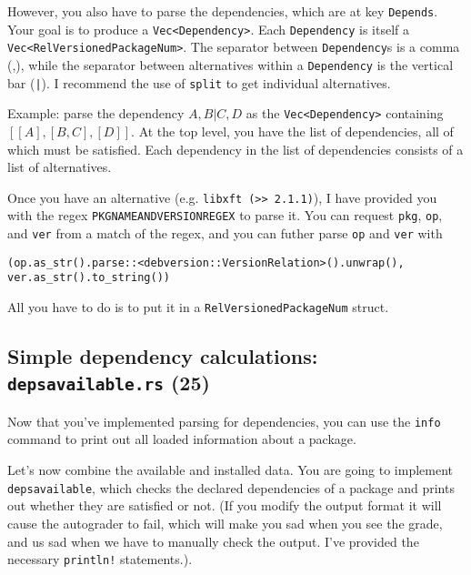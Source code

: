 \documentclass[12pt]{article}
\renewcommand{\_}{\kern-1.5pt\textunderscore\kern-1.5pt}
\begin{document}
\vspace{1em}
However, you also have to parse the dependencies, which are at key \texttt{Depends}. Your goal is to produce a \verb+Vec<Dependency>+.
Each \texttt{Dependency} is itself a \verb+Vec<RelVersionedPackageNum>+. The separator between
\texttt{Dependency}s is a comma (,), while the separator between alternatives within a \texttt{Dependency} is
the vertical bar (\texttt{|}). I recommend the use of \texttt{split} to get individual alternatives.\par

\vspace{1em}
Example: parse the dependency $A, B | C, D$ as the \verb+Vec<Dependency>+ containing $[[A], [B, C], [D]]$. At the top level, you have the list of dependencies, all of which must be satisfied. Each dependency in the list of dependencies consists of a list of alternatives.

\vspace{1em}
Once you have an alternative (e.g. \texttt{libxft (>> 2.1.1)}), I have provided you with the regex \texttt{PKGNAME\_AND\_VERSION\_REGEX} 
to parse it.
You can request \texttt{pkg}, \texttt{op}, and \texttt{ver} from a match of the regex, and you can futher parse \texttt{op}
and \texttt{ver} with
{\small
\begin{verbatim}
(op.as_str().parse::<debversion::VersionRelation>().unwrap(), ver.as_str().to_string())
\end{verbatim}
}
All you have to do is to put it in a \texttt{RelVersionedPackageNum} struct.

\subsection*{Simple dependency calculations: \texttt{deps\_available.rs} (25)}
Now that you've implemented parsing for dependencies, you can use the \texttt{info} command to print out all loaded
information about a package.\par

\vspace{1em}
Let's now combine the available and installed data. You are going to implement \texttt{deps\_available},
which checks the declared dependencies of a package and prints out whether they are satisfied or not.
(If you modify the output format it will cause the autograder to fail, which will make you sad when you see the grade, and us sad when we have to manually check the output.
I've provided the necessary \texttt{println!} statements.).
\end{document}
